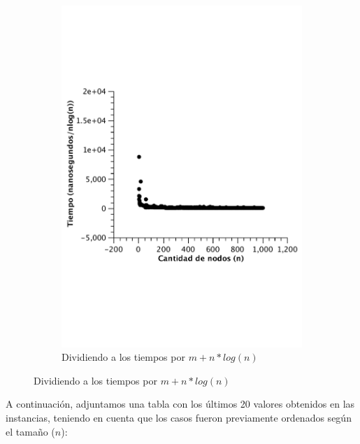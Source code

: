 \begin{figure}[H]
        \begin{subfigure}[b]{0.5\textwidth}
                \includegraphics[width=\textwidth]{imagenes/vacio-listas-4.pdf}
                \caption{Dividiendo a los tiempos por $m + n*log(n)$}
        \end{subfigure}

\end{figure}

A continuación, adjuntamos una tabla con los últimos 20 valores obtenidos en las instancias, teniendo en cuenta que los casos fueron previamente ordenados según el tamaño ($n$):

